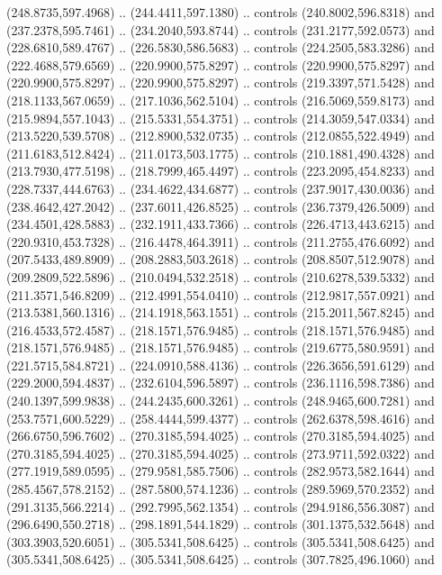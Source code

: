 \begin{scope}[shift={(69.41462,-293.94043)}]
    (248.8735,597.4968) .. (244.4411,597.1380) .. controls (240.8002,596.8318) and
    (237.2378,595.7461) .. (234.2040,593.8744) .. controls (231.2177,592.0573) and
    (228.6810,589.4767) .. (226.5830,586.5683) .. controls (224.2505,583.3286) and
    (222.4688,579.6569) .. (220.9900,575.8297) .. controls (220.9900,575.8297) and
    (220.9900,575.8297) .. (220.9900,575.8297) .. controls (219.3397,571.5428) and
    (218.1133,567.0659) .. (217.1036,562.5104) .. controls (216.5069,559.8173) and
    (215.9894,557.1043) .. (215.5331,554.3751) .. controls (214.3059,547.0334) and
    (213.5220,539.5708) .. (212.8900,532.0735) .. controls (212.0855,522.4949) and
    (211.6183,512.8424) .. (211.0173,503.1775) .. controls (210.1881,490.4328) and
    (213.7930,477.5198) .. (218.7999,465.4497) .. controls (223.2095,454.8233) and
    (228.7337,444.6763) .. (234.4622,434.6877) .. controls (237.9017,430.0036) and
    (238.4642,427.2042) .. (237.6011,426.8525) .. controls (236.7379,426.5009) and
    (234.4501,428.5883) .. (232.1911,433.7366) .. controls (226.4713,443.6215) and
    (220.9310,453.7328) .. (216.4478,464.3911) .. controls (211.2755,476.6092) and
    (207.5433,489.8909) .. (208.2883,503.2618) .. controls (208.8507,512.9078) and
    (209.2809,522.5896) .. (210.0494,532.2518) .. controls (210.6278,539.5332) and
    (211.3571,546.8209) .. (212.4991,554.0410) .. controls (212.9817,557.0921) and
    (213.5381,560.1316) .. (214.1918,563.1551) .. controls (215.2011,567.8245) and
    (216.4533,572.4587) .. (218.1571,576.9485) .. controls (218.1571,576.9485) and
    (218.1571,576.9485) .. (218.1571,576.9485) .. controls (219.6775,580.9591) and
    (221.5715,584.8721) .. (224.0910,588.4136) .. controls (226.3656,591.6129) and
    (229.2000,594.4837) .. (232.6104,596.5897) .. controls (236.1116,598.7386) and
    (240.1397,599.9838) .. (244.2435,600.3261) .. controls (248.9465,600.7281) and
    (253.7571,600.5229) .. (258.4444,599.4377) .. controls (262.6378,598.4616) and
    (266.6750,596.7602) .. (270.3185,594.4025) .. controls (270.3185,594.4025) and
    (270.3185,594.4025) .. (270.3185,594.4025) .. controls (273.9711,592.0322) and
    (277.1919,589.0595) .. (279.9581,585.7506) .. controls (282.9573,582.1644) and
    (285.4567,578.2152) .. (287.5800,574.1236) .. controls (289.5969,570.2352) and
    (291.3135,566.2214) .. (292.7995,562.1354) .. controls (294.9186,556.3087) and
    (296.6490,550.2718) .. (298.1891,544.1829) .. controls (301.1375,532.5648) and
    (303.3903,520.6051) .. (305.5341,508.6425) .. controls (305.5341,508.6425) and
    (305.5341,508.6425) .. (305.5341,508.6425) .. controls (307.7825,496.1060) and

\end{scope}
